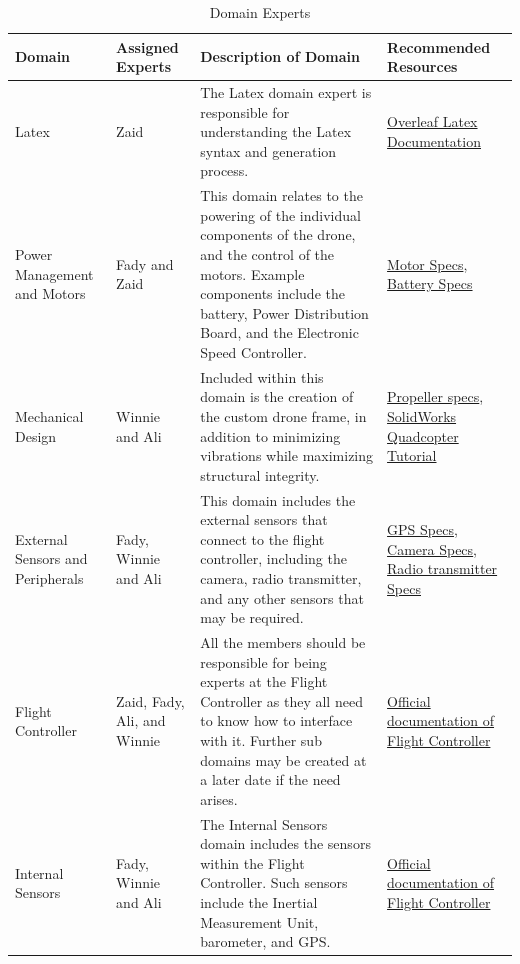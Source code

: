 \documentclass{article}
\begin{document}
\begin{table}[!h]
\begin{center}
\caption {Domain Experts} 
\label{tab:DomainExp}
\begin{tabular}{ | m{2cm} | m{1.5cm} | m{8cm} | m{2.1cm} | } 
\hline
Domain & Assigned Experts & Description of Domain & Recommended Resources\\
\hline
Latex & Zaid & The Latex domain expert is responsible for understanding the Latex syntax and generation process. & \href{https://www.overleaf.com/learn}{Overleaf Latex Documentation}   \\
\hline
Power Management and Motors & Fady and Zaid & This domain relates to the powering of the individual components of the drone, and the control of the motors. Example components include the battery, Power Distribution Board, and the Electronic Speed Controller. & \href{https://rotorvillage.ca/iflight-xing-2205-2300kv-motor/}{Motor Specs}, \href{https://rotorvillage.ca/gnb-1500mah-4s-120c-hv-lipo-xt60/}{Battery Specs} \\
\hline
Mechanical Design & Winnie and Ali & Included within this domain is the creation of the custom drone frame, in addition to minimizing vibrations while maximizing structural integrity. & \href{https://rotorvillage.ca/gemfan-f4s-freestyle-tri-blade-prop-2cw-2ccw/}{Propeller specs}, \href{https://www.youtube.com/watch?v=BZGbkEkqrMM}{SolidWorks Quadcopter Tutorial}\\
\hline
External Sensors and Peripherals & Fady, Winnie and Ali & This domain includes the external sensors that connect to the flight controller, including the camera, radio transmitter, and any other sensors that may be required. & \href{https://www.pishop.ca/product/navio2-gps-gnss-antenna/}{GPS Specs}, \href{https://www.arducam.com/product/arducam-ov5647-standard-raspberry-pi-camera-b0033/}{Camera Specs}, \href{https://www.amazon.ca/Microzone-Transmitter-Quadcopter-Helicopter-Multicopter/dp/B07V3ZG9LN}{Radio transmitter Specs} \\
\hline
Flight Controller & Zaid, Fady, Ali, and Winnie & All the members should be responsible for being experts at the Flight Controller as they all need to know how to interface with it. Further sub domains may be created at a later date if the need arises. &  \href{https://docs.emlid.com/navio2/ardupilot/installation-and-running/}{Official documentation of Flight Controller}\\
\hline
Internal Sensors & Fady, Winnie and Ali & The Internal Sensors domain includes the sensors within the Flight Controller. Such sensors include the Inertial Measurement Unit, barometer, and GPS.  &    \href{https://ardupilot.org/copter/docs/common-navio2-overview.html#specifications}{Official documentation of Flight Controller} \\
\hline
\end{tabular}
\end{center}
\end{table}
\end{document}
